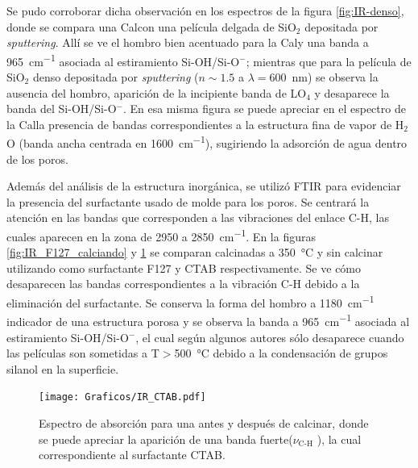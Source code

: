 		 Se pudo corroborar dicha observación en los espectros de la figura \ref{fig:IR-denso}, donde se compara una Cal\pdm\space con una película delgada de SiO$_2$ depositada por \textit{sputtering}. Allí se ve el hombro bien acentuado para la Cal\pdmF\space y una banda a \SI{965}{\cm^{-1}} asociada al estiramiento Si-OH/Si-O$^-$; mientras que para la película de SiO$_2$ denso depositada por \textit{sputtering} ($n\sim 1.5$ a $\lambda=$\SI{600}{\nm})\cite{Vergohl1999} se observa la ausencia del hombro, aparición de la incipiente banda de LO$_4$ y desaparece la banda del Si-OH/Si-O$^-$. En esa misma figura se puede apreciar en el espectro de la Cal\pdmF\space la presencia de bandas correspondientes a la estructura fina de vapor de H$_2$O (banda ancha centrada en \SI{1600}{\cm^{-1}}), sugiriendo la adsorción de agua dentro de los poros. 

		 Además del análisis de la estructura inorgánica, se utilizó FTIR para evidenciar la presencia del surfactante usado de molde para los poros. Se centrará la atención en las bandas que corresponden a las vibraciones del enlace C-H, las cuales aparecen en la zona de 2950 a \SI{2850}{\cm^{-1}}. En la figuras \ref{fig:IR_F127_calciando} y \ref{fig:IR_CTAB_calcinado} se comparan \pdm\space calcinadas a \SI{350}{\celsius} y sin calcinar utilizando como surfactante F127 y CTAB respectivamente. Se ve cómo desaparecen las bandas correspondientes a la vibración C-H debido a la eliminación del surfactante. Se conserva la forma del hombro a \SI{1180}{\cm^{-1}} indicador de una estructura porosa y se observa la banda a \SI{965}{\cm^{-1}} asociada al estiramiento Si-OH/Si-O$^-$, el cual según algunos autores sólo desaparece cuando las películas son sometidas a T$>$\SI{500}{\celsius} debido a la condensación de grupos silanol en la superficie.\cite{Innocenzi2003,Almeida1990,Bertoluzza1982}

		 		\begin{figure}[t!]
						\begin{center}
						\texttt{[image: Graficos/IR\_CTAB.pdf]}
						\caption[FTIR para una \pdmC.]{Espectro de absorción para una \pdmC\space antes y después de calcinar, donde se puede apreciar la aparición de una banda fuerte($\nu_\text{C-H}$ ), la cual correspondiente al surfactante CTAB.}
						\label{fig:IR_CTAB_calcinado}
						\end{center}
						\end{figure}

